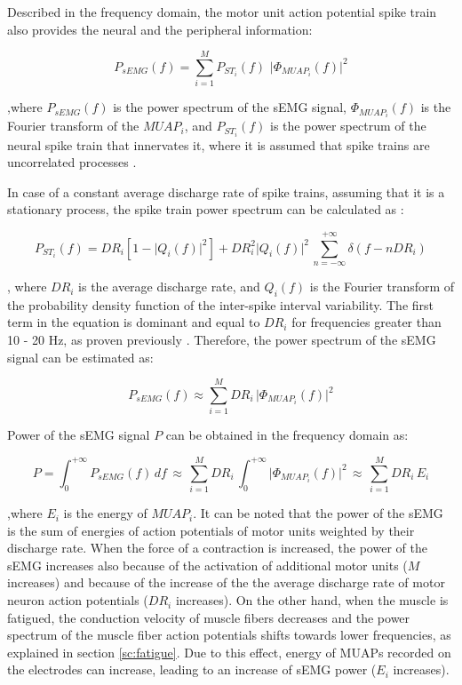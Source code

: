 Described in the frequency domain, the motor unit action potential spike train also provides the neural and the peripheral information:

\begin{equation}
P_{sEMG}(f) = \sum_{i=1}^{M} P_{ST_i}(f) \, \, \big\vert \Phi_{MUAP_i}(f) \big\vert^2
\end{equation}

,where $P_{sEMG}(f)$ is the power spectrum of the sEMG signal, $\Phi_{MUAP_i}(f)$ is the Fourier transform of the $MUAP_i$, and $P_{ST_i}(f)$ is the power spectrum of the neural spike train that innervates it, where it is assumed that spike trains are uncorrelated processes \citep{Farina2014}.

In case of a constant average discharge rate of spike trains, assuming that it is a stationary process, the spike train power spectrum can be calculated as \citep{Farina2014}:

\begin{equation}
P_{ST_i}(f) = DR_i \left[ 1- \big\vert Q_i(f)\big\vert^2 \right] + DR_i^2  \big\vert Q_i(f)\big\vert^2 \,  \sum_{n=-\infty}^{+\infty} \delta(f - n DR_i)
\end{equation}

, where $DR_i$ is the average discharge rate, and $Q_i(f)$ is the Fourier transform of the probability density function of the inter-spike interval variability. The first term in the equation is dominant and equal to $DR_i$ for frequencies greater than 10 - 20 Hz, as proven previously \citep{Lago1977, Farina2014}. Therefore, the power spectrum of the sEMG signal can be estimated as:

\begin{equation}
P_{sEMG}(f) \approx  \sum_{i=1}^{M} DR_i \, \big\vert \Phi_{MUAP_i}(f) \big\vert^2
\end{equation}

Power of the sEMG signal $P$ can be obtained in the frequency domain as:

\begin{equation}
P = \int_0^{+\infty} P_{sEMG}(f)  \, df  \, \approx \, \sum_{i=1}^{M} DR_i \, \int_0^{+\infty} \big\vert \Phi_{MUAP_i}(f) \big\vert^2 \, \approx \, \sum_{i=1}^{M} DR_i \,E_i
\end{equation}

,where $E_i$ is the energy of $MUAP_i$. It can be noted that the power of the sEMG is the sum of energies of action potentials of motor units weighted by their discharge rate. When the force of a contraction is increased, the power of the sEMG increases also because of the activation of additional motor units ($M$ increases) and because of the increase of the the average discharge rate of motor neuron action potentials ($DR_i$ increases). On the other hand, when the muscle is fatigued, the conduction velocity of muscle fibers decreases and the power spectrum of the muscle fiber action potentials shifts towards lower frequencies, as explained in section \ref{sc:fatigue}. Due to this effect, energy of MUAPs recorded on the electrodes can increase, leading to an increase of sEMG power ($E_i$ increases).

